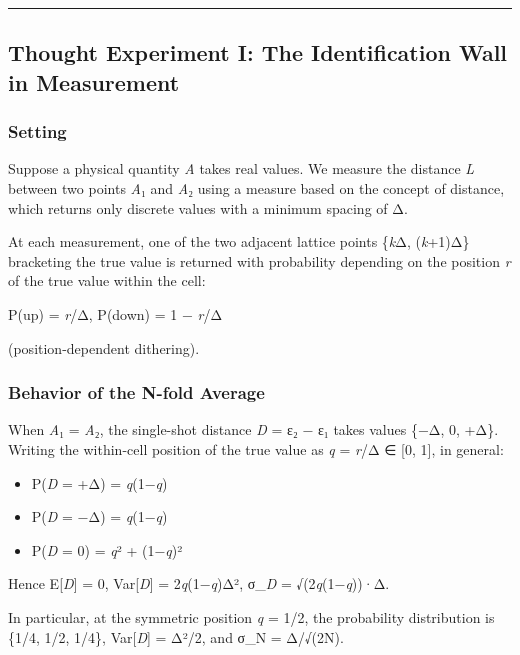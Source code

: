 \documentclass[
  11pt,
]{article}
\providecommand{\tightlist}{%
  \setlength{\itemsep}{0pt}\setlength{\parskip}{0pt}}
\begin{document}
\begin{center}\rule{0.5\linewidth}{0.5pt}\end{center}

\subsection{Thought Experiment I: The Identification Wall in
Measurement}\label{thought-experiment-i-the-identification-wall-in-measurement}

\subsubsection{Setting}\label{setting}

Suppose a physical quantity \emph{A} takes real values. We measure the
distance \emph{L} between two points \emph{A}₁ and \emph{A}₂ using a
measure based on the concept of distance, which returns only discrete
values with a minimum spacing of Δ.

At each measurement, one of the two adjacent lattice points \{\emph{k}Δ,
(\emph{k}+1)Δ\} bracketing the true value is returned with probability
depending on the position \emph{r} of the true value within the cell:

P(up) = \emph{r}/Δ, P(down) = 1 − \emph{r}/Δ

(position-dependent dithering).

\subsubsection{Behavior of the N-fold
Average}\label{behavior-of-the-n-fold-average}

When \emph{A}₁ = \emph{A}₂, the single-shot distance \emph{D} = ε₂ − ε₁
takes values \{−Δ, 0, +Δ\}. Writing the within-cell position of the true
value as \emph{q} = \emph{r}/Δ ∈ {[}0, 1{]}, in general:

\begin{itemize}
\tightlist
\item
  P(\emph{D} = +Δ) = \emph{q}(1−\emph{q})
\item
  P(\emph{D} = −Δ) = \emph{q}(1−\emph{q})
\item
  P(\emph{D} = 0) = \emph{q}² + (1−\emph{q})²
\end{itemize}

Hence E{[}\emph{D}{]} = 0, Var{[}\emph{D}{]} = 2\emph{q}(1−\emph{q})Δ²,
σ\_\emph{D} = √(2\emph{q}(1−\emph{q}))·Δ.

In particular, at the symmetric position \emph{q} = 1/2, the probability
distribution is \{1/4, 1/2, 1/4\}, Var{[}\emph{D}{]} = Δ²/2, and σ\_N =
Δ/√(2N).
\end{document}

